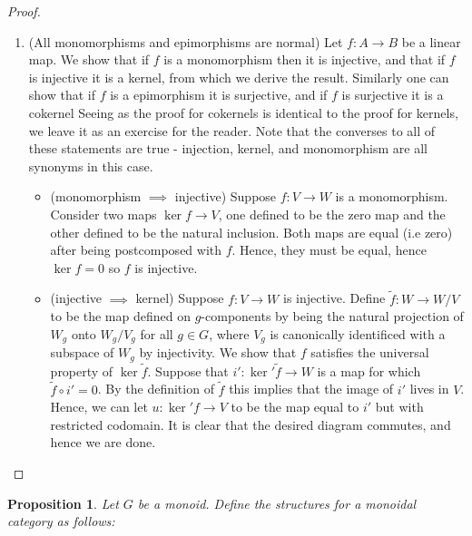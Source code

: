 \documentclass{article}
\newtheorem{proposition}{Proposition}[section]
\theoremstyle{definition}
\numberwithin{figure}{section}
\begin{document}
\begin{enumerate}[\thesection .1.]
\begin{proof}
\begin{enumerate}
The fact that $f\circ i=0$ follows from the defnition of kernel. Suppose that $i':\ker' f\to A$ is such that $f\circ i'=0$. On the level of $g$-components, this means that for any $v\in (\ker' f)_g$ we have that $f(i'(v))=0$. Hence, $i'(v)\in \ker f$. Letting $u$ by $i'$ with codomain restriced to $\ker f$, it is tautological the desired diagram commutes. Thus, this completes the proof.

\item (All monomorphisms and epimorphisms are normal) Let $f:A\to B$ be a linear map. We show that if $f$ is a monomorphism then it is injective, and that if $f$ is injective it is a kernel, from which we derive the result. Similarly one can show that if $f$ is a epimorphism it is surjective, and if $f$ is surjective it is a cokernel Seeing as the proof for cokernels is identical to the proof for kernels, we leave it as an exercise for the reader. Note that the converses to all of these statements are true - injection, kernel, and monomorphism are all synonyms in this case.

\begin{itemize}
\item (monomorphism $\implies$ injective) Suppose $f:V\to W$ is a monomorphism. Consider two maps $\ker f\to V$, one defined to be the zero map and the other defined to be the natural inclusion. Both maps are equal (i.e zero) after being postcomposed with $f$. Hence, they must be equal, hence $\ker f =0$ so $f$ is injective.

\item (injective $\implies$ kernel) Suppose $f: V\to W$ is injective. Define $\tilde{f}: W\to W/V$ to be the map defined on $g$-components by being the natural projection of $W_g$ onto $W_g/V_g$ for all $g\in G$, where $V_g$ is canonically identificed with a subspace of $W_g$ by injectivity. We show that $f$ satisfies the universal property of $\ker \tilde{f}$. Suppose that $i':\ker' \tilde{f}\to W$ is a map for which $\tilde{f}\circ i'=0$. By the definition of $\tilde{f}$ this implies that the image of $i'$ lives in $V$. Hence, we can let $u: \ker' f\to V$ to be the map equal to $i'$ but with restricted codomain. It is clear that the desired diagram commutes, and hence we are done.
\end{itemize}
\end{enumerate}
\end{proof}


\begin{proposition} Let $G$ be a monoid. Define the structures for a monoidal category as follows:


\end{proposition}
\end{enumerate}
\end{document}
